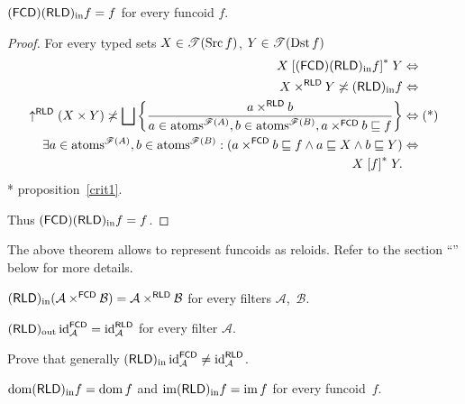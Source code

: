 \begin{thm}
$(\mathsf{FCD})(\mathsf{RLD})_{\mathrm{in}} f=f$ for every funcoid $f$.\end{thm}
\begin{proof}
For every typed sets $X\in\mathscr{T}(\operatorname{Src} f)$, $Y\in\mathscr{T}(\operatorname{Dst} f)$
\begin{align*}
X\mathrel{\left[(\mathsf{FCD})(\mathsf{RLD})_{\mathrm{in}} f\right]^{\ast}}Y & \Leftrightarrow\\
X\times^{\mathsf{RLD}}Y\not\asymp(\mathsf{RLD})_{\mathrm{in}} f & \Leftrightarrow\\
\uparrow^{\mathsf{RLD}}(X\times Y)\not\asymp\bigsqcup\left\{ \frac{a\times^{\mathsf{RLD}}b}{a\in\operatorname{atoms}^{\mathscr{F}(A)},b\in\operatorname{atoms}^{\mathscr{F}(B)},a\times^{\mathsf{FCD}}b\sqsubseteq f}\right\} & \Leftrightarrow\text{(*)}\\
\exists a\in\operatorname{atoms}^{\mathscr{F}(A)},b\in\operatorname{atoms}^{\mathscr{F}(B)}:(a\times^{\mathsf{FCD}}b\sqsubseteq f\land a\sqsubseteq X\land b\sqsubseteq Y) & \Leftrightarrow\\
X\mathrel{\left[f\right]^{\ast}}Y.
\end{align*}
{*} proposition~\ref{crit1}.

Thus $(\mathsf{FCD})(\mathsf{RLD})_{\mathrm{in}} f=f$.\end{proof}
\begin{rem}
The above theorem allows to represent funcoids as reloids. Refer to
the section ``'' below for more details.\end{rem}
\begin{obvious}
$(\mathsf{RLD})_{\mathrm{in}}(\mathcal{A}\times^{\mathsf{FCD}}\mathcal{B})=\mathcal{A}\times^{\mathsf{RLD}}\mathcal{B}$
for every filters $\mathcal{A}$,~$\mathcal{B}$.\end{obvious}
\begin{conjecture}
$(\mathsf{RLD})_{\mathrm{out}}\operatorname{id}_{\mathcal{A}}^{\mathsf{FCD}}=\operatorname{id}_{\mathcal{A}}^{\mathsf{RLD}}$
for every filter $\mathcal{A}$.\end{conjecture}
\begin{xca}
Prove that generally $(\mathsf{RLD})_{\mathrm{in}}\operatorname{id}_{\mathcal{A}}^{\mathsf{FCD}}\ne\operatorname{id}_{\mathcal{A}}^{\mathsf{RLD}}$.\end{xca}
\begin{prop}
$\operatorname{dom}(\mathsf{RLD})_{\mathrm{in}} f=\operatorname{dom} f$ and $\operatorname{im}(\mathsf{RLD})_{\mathrm{in}} f=\operatorname{im} f$ for every funcoid~$f$.\end{prop}
